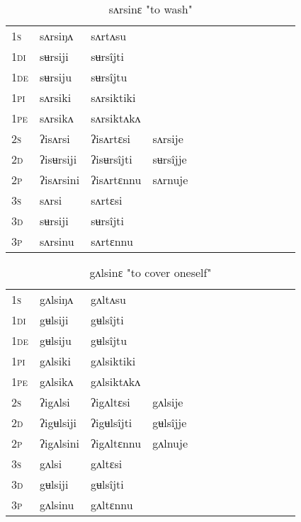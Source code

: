 \documentclass[oldfontcommands,oneside,a4paper,11pt]{article}
\begin{document}
\begin{table}[H]
\label{ur.vr} \centering 
\caption{sʌrsinɛ  "to wash"  }
\begin{tabular}{l|l|l|l|l|l|l|l|l|l|l|l|l}  \toprule
\textsc{1s} &sʌrsiŋʌ &sʌrtʌsu \\ 
\textsc{1di} &sʉrsiji &sʉrsîjti   \\
\textsc{1de} &sʉrsiju &sʉrsîjtu   \\ 
\textsc{1pi} &sʌrsiki &sʌrsiktiki   \\ 
\textsc{1pe} &sʌrsikʌ &sʌrsiktʌkʌ   \\ 
\textsc{2s} & ʔisʌrsi & ʔisʌrtɛsi &sʌrsije  \\ 
\textsc{2d} & ʔisʉrsiji & ʔisʉrsîjti &sʉrsîjje    \\
\textsc{2p} & ʔisʌrsini  & ʔisʌrtɛnnu &sʌrnuje  \\ 
\textsc{3s} & sʌrsi & sʌrtɛsi   \\ 
\textsc{3d} & sʉrsiji & sʉrsîjti   \\ 
\textsc{3p} & sʌrsinu  & sʌrtɛnnu \\ 
\bottomrule
\end{tabular}
\end{table}


\begin{table}[H]
\label{ul.vr} \centering 
\caption{gʌlsinɛ  "to cover oneself"  }
\begin{tabular}{l|l|l|l|l|l|l|l|l|l|l|l|l}  \toprule
\textsc{1s} &gʌlsiŋʌ &gʌltʌsu \\ 
\textsc{1di} &gʉlsiji &gʉlsîjti   \\
\textsc{1de} &gʉlsiju &gʉlsîjtu   \\ 
\textsc{1pi} &gʌlsiki &gʌlsiktiki   \\ 
\textsc{1pe} &gʌlsikʌ &gʌlsiktʌkʌ   \\ 
\textsc{2s} & ʔigʌlsi & ʔigʌltɛsi &gʌlsije  \\ 
\textsc{2d} & ʔigʉlsiji & ʔigʉlsîjti &gʉlsîjje    \\
\textsc{2p} & ʔigʌlsini  & ʔigʌltɛnnu &gʌlnuje  \\ 
\textsc{3s} & gʌlsi & gʌltɛsi   \\ 
\textsc{3d} & gʉlsiji & gʉlsîjti   \\ 
\textsc{3p} & gʌlsinu  & gʌltɛnnu \\ 
\bottomrule
\end{tabular}
\end{table}
\end{document}
